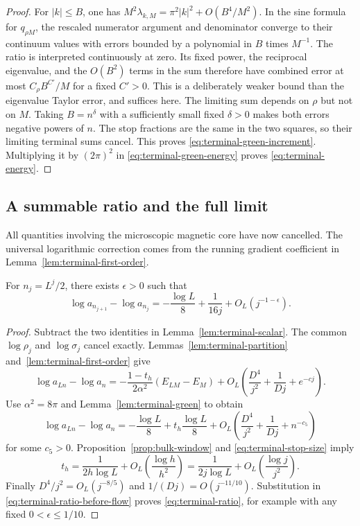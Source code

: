 \begin{proof}
For $|k|\leq B$, one has
$M^2\lambda_{k,M}=\pi^2|k|^2+O(B^4/M^2)$.  In the sine formula for
$q_{\rho M}$, the rescaled numerator argument and denominator converge
to their continuum values with errors bounded by a polynomial in $B$
times $M^{-1}$.  The ratio is interpreted continuously at zero.
Its fixed power, the reciprocal eigenvalue, and the $O(B^2)$ terms
in the sum therefore have combined error at most
$C_\rho B^{C'}/M$ for a fixed $C'>0$.  This is a deliberately weaker
bound than the eigenvalue Taylor error, and suffices here.  The
limiting sum depends on $\rho$ but not on $M$.  Taking $B=n^\delta$
with a sufficiently small fixed $\delta>0$ makes both errors negative
powers of $n$.  The stop fractions are the same in the two squares,
so their limiting terminal sums cancel.  This proves
\eqref{eq:terminal-green-increment}.  Multiplying it by $(2\pi)^2$
in \eqref{eq:terminal-green-energy} proves
\eqref{eq:terminal-energy}.
\end{proof}

\subsection{A summable ratio and the full limit}

All quantities involving the microscopic magnetic core have now
cancelled.  The universal logarithmic correction comes from the
running gradient coefficient in Lemma~\ref{lem:terminal-first-order}.

\begin{proposition}
\label{prop:ratio}
For $n_j=L^j/2$, there exists $\epsilon>0$ such that
\begin{equation}
 \log a_{n_{j+1}}-\log a_{n_j}
   =-\frac{\log L}{8}+\frac1{16j}
       +O_L(j^{-1-\epsilon}).
 \label{eq:terminal-ratio}
\end{equation}
\end{proposition}

\begin{proof}
Subtract the two identities in
Lemma~\ref{lem:terminal-scalar}.  The common $\log\rho_j$ and
$\log\sigma_j$ cancel exactly.  Lemmas~\ref{lem:terminal-partition}
and~\ref{lem:terminal-first-order} give
\[
 \log a_{Ln}-\log a_n
 =-\frac{1-t_h}{2\alpha^2}(E_{LM}-E_M)
   +O_L\left(\frac{D^4}{j^2}+\frac1{Dj}+e^{-cj}\right).
\]
Use $\alpha^2=8\pi$ and Lemma~\ref{lem:terminal-green} to obtain
\begin{equation}
 \log a_{Ln}-\log a_n
 =-\frac{\log L}{8}
      +t_h\frac{\log L}{8}
      +O_L\left(\frac{D^4}{j^2}+\frac1{Dj}+n^{-c_5}\right)
 \label{eq:terminal-ratio-before-flow}
\end{equation}
for some $c_5>0$.  Proposition~\ref{prop:bulk-window} and
\eqref{eq:terminal-stop-size} imply
\[
 t_h=\frac1{2h\log L}+O_L\left(\frac{\log h}{h^2}\right)
     =\frac1{2j\log L}+O_L\left(\frac{\log j}{j^2}\right).
\]
Finally $D^4/j^2=O_L(j^{-8/5})$ and
$1/(Dj)=O(j^{-11/10})$.  Substitution in
\eqref{eq:terminal-ratio-before-flow} proves
\eqref{eq:terminal-ratio}, for example with any fixed
$0<\epsilon\leq1/10$.
\end{proof}

